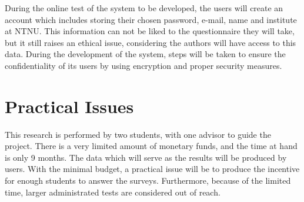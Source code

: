 During the online test of the system to be developed, the users will create an account which includes storing their chosen password, e-mail, name and institute at NTNU. This information can not be liked to the questionnaire they will take, but it still raises an ethical issue, considering the authors will have access to this data. During the development of the system, steps will be taken to ensure the confidentiality of its users by using encryption and proper security measures.


\section{Practical Issues}
This research is performed by two students, with one advisor to guide the project. There is a very limited amount of monetary funds, and the time at hand is only 9 months. The data which will serve as the results will be produced by users. With the minimal budget, a practical issue will be to produce the incentive for enough students to answer the surveys. Furthermore, because of the limited time, larger administrated tests are considered out of reach. 

\cleardoublepage